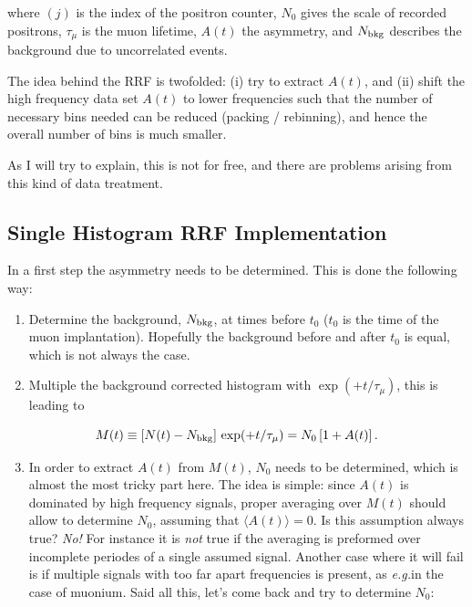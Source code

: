 \documentclass[twoside]{article}
\newcommand{\eg}{\emph{e.g.\xspace}}
\begin{document}
\noindent where $(j)$ is the index of the positron counter, $N_0$ gives the scale
of recorded positrons, $\tau_\mu$ is the muon lifetime, $A(t)$ the asymmetry, and $N_{\rm bkg}$
describes the background due to uncorrelated events.

The idea behind the RRF is twofolded: (i) try to extract $A(t)$, and (ii) shift the high frequency
data set $A(t)$ to lower frequencies such that the number of necessary bins needed can be
reduced (packing / rebinning), and hence the overall number of bins is much smaller.

As I will try to explain, this is not for free, and there are problems arising from
this kind of data treatment.

\subsection{Single Histogram RRF Implementation}

In a first step the asymmetry needs to be determined. This is done the following way:
\begin{enumerate}
 \item Determine the background, $N_{\rm bkg}$, at times before $t_0$ ($t_0$ is the time of the muon
       implantation). Hopefully the background before and after $t_0$ is equal, which is not always
       the case.
 \item Multiple the background corrected histogram with $\exp(+t / \tau_\mu)$, this is leading to
\end{enumerate}

\begin{equation}\label{eq:Mt}
 M(t) \equiv \left[ N(t) - N_{\rm bkg} \right]\,\exp(+t / \tau_\mu) = N_0 \left[ 1 + A(t) \right].
\end{equation}

\begin{enumerate}
 \setcounter{enumi}{2}
 \item In order to extract $A(t)$ from $M(t)$, $N_0$ needs to be determined, which is almost the
       most tricky part here. The idea is simple: since $A(t)$ is dominated by high frequency signals,
       proper averaging over $M(t)$ should allow to determine $N_0$, assuming that $\langle A(t) \rangle = 0$.
       Is this assumption always true? \emph{No!} For instance it is \emph{not} true if the averaging is preformed
       over incomplete periodes of a single assumed signal. Another case where it will fail is if multiple signals
       with too far apart frequencies is present, as \eg in the case of muonium. Said all this, let's come
       back and try to determine $N_0$:
\end{enumerate}
\end{document}
